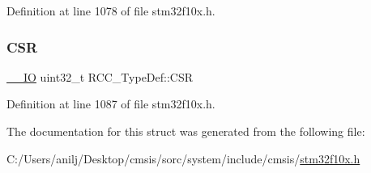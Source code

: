 Definition at line 1078 of file stm32f10x.\+h.

\mbox{\label{struct_r_c_c___type_def_a7e913b8bf59d4351e1f3d19387bd05b9}} 
\subsubsection{\texorpdfstring{C\+SR}{CSR}}
{\footnotesize\ttfamily \hyperlink{core__sc300_8h_aec43007d9998a0a0e01faede4133d6be}{\+\_\+\+\_\+\+IO} uint32\+\_\+t R\+C\+C\+\_\+\+Type\+Def\+::\+C\+SR}



Definition at line 1087 of file stm32f10x.\+h.



The documentation for this struct was generated from the following file\+:\begin{DoxyCompactItemize}
\item 
C\+:/\+Users/anilj/\+Desktop/cmsis/sorc/system/include/cmsis/\hyperlink{stm32f10x_8h}{stm32f10x.\+h}\end{DoxyCompactItemize}
